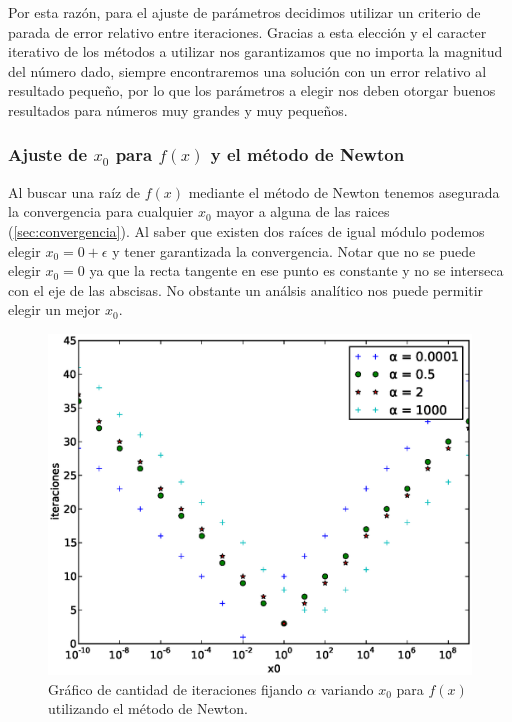 Por esta razón, para el ajuste de parámetros decidimos utilizar un criterio de
parada de error relativo entre iteraciones. Gracias a esta elección y el
caracter iterativo de los métodos a utilizar nos garantizamos que no importa la
magnitud del número dado, siempre encontraremos una solución con un error
relativo al resultado pequeño, por lo que los parámetros a elegir nos deben
otorgar buenos resultados para números muy grandes y muy pequeños.

\subsubsection{Ajuste de $x_0$ para $f(x)$ y el método de Newton}
\label{ssub:ajuste_f_x0_newton}

Al buscar una raíz de $f(x)$ mediante el método de Newton tenemos asegurada la
convergencia para cualquier $x_0$ mayor a alguna de las raices
(\ref{sec:convergencia}). Al saber que existen dos raíces de igual módulo
podemos elegir $x_0 = 0 + \epsilon$ y tener garantizada la convergencia. Notar
que no se puede elegir $x_0 = 0$ ya que la recta tangente en ese punto es
constante y no se interseca con el eje de las abscisas. No obstante un análsis
analítico nos puede permitir elegir un mejor $x_0$.

\begin{figure}[!htbp]
  \begin{center}
    \includegraphics[scale=0.5]{graficos/new/f_newton_x0_variable.eps}
    \caption{\label{fig:f_newton_x0_variable} Gráfico de cantidad de iteraciones fijando $\alpha$ variando $x_0$ para $f(x)$ utilizando el método de Newton.}
  \end{center}
\end{figure}

